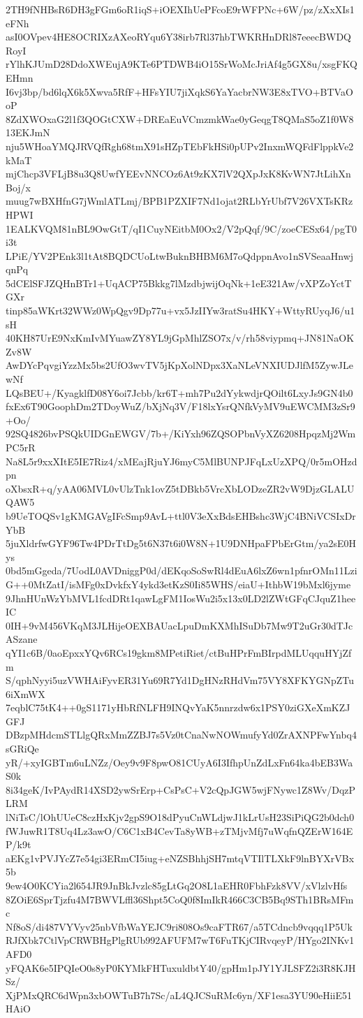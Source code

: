 2TH9fNHBsR6DH3gFGm6oR1iqS+iOEXIhUePFcoE9rWFPNc+6W/pz/zXxXIs1eFNh
asI0OVpev4HE8OCRIXzAXeoRYqu6Y38irb7Rl37hbTWKRHnDRl87eeecBWDQRoyI
rYlhKJUmD28DdoXWEujA9KTe6PTDWB4iO15SrWoMcJriAf4g5GX8u/xsgFKQEHmn
I6vj3bp/bd6lqX6k5Xwva5RfF+HFsYIU7jiXqkS6YaYacbrNW3E8xTVO+BTVaOoP
8ZdXWOxaG2l1f3QOGtCXW+DREaEuVCmzmkWae0yGeqgT8QMaS5oZ1f0W813EKJmN
nju5WHoaYMQJRVQfRgh68tmX91sHZpTEbFkHSi0pUPv2InxmWQFdFlppkVe2kMaT
mjChcp3VFLjB8u3Q8UwfYEEvNNCOz6At9zKX7lV2QXpJxK8KvWN7JtLihXnBoj/x
muug7wBXHfnG7jWmlATLmj/BPB1PZXIF7Nd1ojat2RLbYrUbf7V26VXTsKRzHPWI
1EALKVQM81nBL9OwGtT/qI1CuyNEitbM0Ox2/V2pQqf/9C/zoeCESx64/pgT0i3t
LPiE/YV2PEnk3l1tAt8BQDCUoLtwBuknBHBM6M7oQdppnAvo1nSVSeaaHnwjqnPq
5dCElSFJZQHnBTr1+UqACP75Bkkg7lMzdbjwijOqNk+1eE321Aw/vXPZoYctTGXr
tinp85aWKrt32WWz0WpQgv9Dp77u+vx5JzIIYw3ratSu4HKY+WttyRUyqJ6/u1sH
40KH87UrE9NxKmIvMYuawZY8YL9jGpMhlZSO7x/v/rh58viypmq+JN81NaOKZv8W
AwDYcPqvgiYzzMx5bs2UfO3wvTV5jKpXolNDpx3XaNLeVNXIUDJlfM5ZywJLewNf
LQsBEU+/KyagklfD08Y6oi7Jcbb/kr6T+mh7Pu2dYykwdjrQOilt6LxyJs9GN4b0
fxEx6T90GoophDm2TDoyWuZ/bXjNq3V/F18lxYsrQNfkVyMV9uEWCMM3zSr9+Oo/
92SQ4826bvPSQkUIDGnEWGV/7b+/KiYxh96ZQSOPbnVyXZ6208HpqzMj2WmPC5rR
Na8L5r9xxXItE5IE7Riz4/xMEajRjuYJ6myC5MlBUNPJFqLxUzXPQ/0r5mOHzdpn
oXbsxR+q/yAA06MVL0vUlzTnk1ovZ5tDBkb5VrcXbLODzeZR2vW9DjzGLALUQAW5
b9UeTOQSv1gKMGAVgIFcSmp9AvL+ttl0V3eXxBdsEHBshc3WjC4BNiVCSIxDrYbB
5juXldrfwGYF96Tw4PDrTtDg5t6N37t6i0W8N+1U9DNHpaFPbErGtm/ya2sE0Hys
0bd5mGgeda/7UodL0AVDniggP0d/dEKqoSoSwRl4dEuA6lxZ6wn1pfnrOMn11Lzi
G++0MtZatI/isMFg0xDvkfxY4ykd3etKzS0Ii85WHS/eiaU+IthbW19bMxl6jyme
9JhnHUnWzYbMVL1fcdDRt1qawLgFM1IosWu2i5x13x0LD2lZWtGFqCJquZ1heeIC
0IH+9vM456VKqM3JLHijeOEXBAUacLpuDmKXMhISuDb7Mw9T2uGr30dTJcASzane
qYI1c6B/0aoEpxxYQv6RCs19gkm8MPetiRiet/ctBuHPrFmBIrpdMLUqquHYjZfm
S/qphNyyi5uzVWHAiFyvER31Yu69R7Yd1DgHNzRHdVm75VY8XFKYGNpZTu6iXmWX
7eqblC75tK4++0gS1171yHbRfNLFH9INQvYaK5nnrzdw6x1PSY0ziGXeXmKZJGFJ
DBzpMHdcmSTLlgQRxMmZZBJ7s5Vz0tCnaNwNOWmufyYd0ZrAXNPFwYnbq4sGRiQe
yR/+xyIGBTm6uLNZz/Oey9v9F8pwO81CUyA6I3IfhpUnZdLxFn64ka4bEB3WaS0k
8i34geK/IvPAydR14XSD2ywSrErp+CsPsC+V2cQpJGW5wjFNywc1Z8Wv/DqzPLRM
lNiTsC/lOhUUeC8czHxKjv2gpS9O18dPyuCnWLdjwJ1kLrUsH23SiPiQG2b0dch0
fWJuwR1T8Uq4Lz3awO/C6C1xB4CevTa8yWB+zTMjvMfj7uWqfnQZErW164EP/k9t
aEKg1vPVJYcZ7e54gi3ERmCI5iug+eNZSBhhjSH7mtqVTIlTLXkF9lnBYXrVBx5b
9ew4O0KCYia2l654JR9JnBkJvzlc85gLtGq2O8L1aEHR0FbhFzk8VV/xVlzlvHfs
8ZOiE6SprTjzfu4M7BWVLffl36Shpt5CoQ0f8ImIkR466C3CB5Bq9STh1BRsMFmc
Nf8oS/di487VYVyv25nbVfbWaYEJC9ri808Os9caFTR67/a5TCdncb9vqqq1P5Uk
RJfXbk7CtlVpCRWBHgPlgRUb992AFUFM7wT6FuTKjCIRvqeyP/HYgo2INKv1AFD0
yFQAK6e5IPQIeO0s8yP0KYMkFHTuxuldbtY40/gpHm1pJY1YJLSFZ2i3R8KJHSz/
XjPMxQRC6dWpn3xbOWTuB7h7Sc/aL4QJCSuRMc6yn/XF1esa3YU90eHiiE51HAiO

